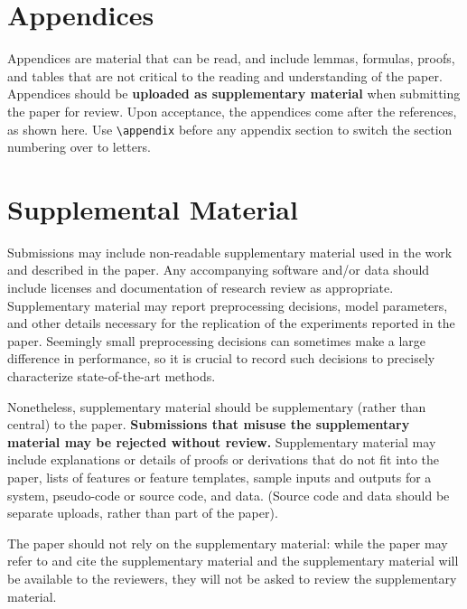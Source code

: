 \documentclass[11pt,a4paper]{article}
\begin{document}
\appendix

\section{Appendices}
\label{sec:appendix}
Appendices are material that can be read, and include lemmas, formulas, proofs, and tables that are not critical to the reading and understanding of the paper. 
Appendices should be \textbf{uploaded as supplementary material} when submitting the paper for review. Upon acceptance, the appendices come after the references, as shown here. Use
\verb|\appendix| before any appendix section to switch the section
numbering over to letters.


\section{Supplemental Material}
\label{sec:supplemental}
Submissions may include non-readable supplementary material used in the work and described in the paper. Any accompanying software and/or data should include licenses and documentation of research review as appropriate. Supplementary material may report preprocessing decisions, model parameters, and other details necessary for the replication of the experiments reported in the paper. Seemingly small preprocessing decisions can sometimes make a large difference in performance, so it is crucial to record such decisions to precisely characterize state-of-the-art methods. 

Nonetheless, supplementary material should be supplementary (rather
than central) to the paper. \textbf{Submissions that misuse the supplementary 
material may be rejected without review.}
Supplementary material may include explanations or details
of proofs or derivations that do not fit into the paper, lists of
features or feature templates, sample inputs and outputs for a system,
pseudo-code or source code, and data. (Source code and data should
be separate uploads, rather than part of the paper).

The paper should not rely on the supplementary material: while the paper
may refer to and cite the supplementary material and the supplementary material will be available to the
reviewers, they will not be asked to review the
supplementary material.
\end{document}
